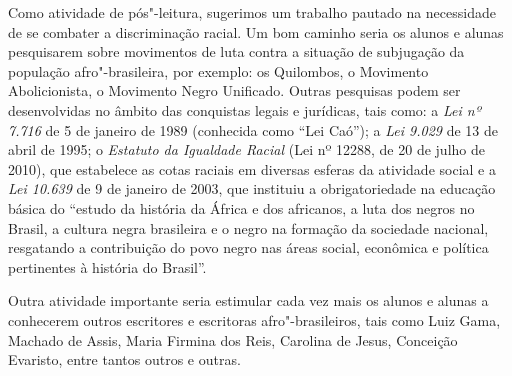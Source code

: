 \documentclass{extarticle}
\begin{document}
Como atividade de pós"-leitura, sugerimos um trabalho pautado na
necessidade de se combater a discriminação racial. Um bom caminho seria
os alunos e alunas pesquisarem sobre movimentos de luta contra a
situação de subjugação da população afro"-brasileira, por exemplo: os
Quilombos, o Movimento Abolicionista, o Movimento Negro Unificado.
Outras pesquisas podem ser desenvolvidas no âmbito das conquistas legais
e jurídicas, tais como: a \textit{Lei nº 7.716} de 5 de janeiro de 1989
(conhecida como ``Lei Caó''); a \textit{Lei 9.029} de 13 de abril de
1995; o \textit{Estatuto da Igualdade Racial} (Lei nº 12288, de 20 de
julho de 2010), que estabelece as cotas raciais em diversas esferas da
atividade social e a \textit{Lei 10.639} de 9 de janeiro de 2003, que
instituiu a obrigatoriedade na educação básica do ``estudo da história
da África e dos africanos, a luta dos negros no Brasil, a cultura negra
brasileira e o negro na formação da sociedade nacional, resgatando a
contribuição do povo negro nas áreas social, econômica e política
pertinentes à história do Brasil''.

Outra atividade importante seria estimular cada vez mais os alunos e
alunas a conhecerem outros escritores e escritoras afro"-brasileiros,
tais como Luiz Gama, Machado de Assis, Maria Firmina dos Reis, Carolina
de Jesus, Conceição Evaristo, entre tantos outros e outras.
\end{document}
